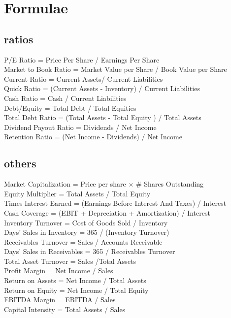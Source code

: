 \section{Formulae}
\subsection*{ratios}
\begin{scriptsize}
P/E Ratio = Price Per Share / Earnings Per Share \\
Market to Book Ratio = Market Value per Share / Book Value per Share \\
Current Ratio = Current Assets/ Current Liabilities \\
Quick Ratio = (Current Assets - Inventory) / Current Liabilities \\
Cash Ratio = Cash / Current Liabilities \\
Debt/Equity = Total Debt / Total Equities \\
Total Debt Ratio = (Total Assets - Total Equity ) / Total Assets \\
Dividend Payout Ratio = Dividends / Net Income \\
Retention Ratio = (Net Income - Dividends) / Net Income \\
\end{scriptsize}
\subsection*{others}
\begin{scriptsize}
Market Capitalization = Price per share $\times$ \# Shares Outstanding \\
Equity Multiplier = Total Assets / Total Equity \\
Times Interest Earned = (Earnings Before Interest And Taxes) / Interest \\
Cash Coverage = (EBIT + Depreciation + Amortization) / Interest \\
Inventory Turnover = Cost of Goods Sold / Inventory \\
Days' Sales in Inventory = 365 / (Inventory Turnover) \\
Receivables Turnover = Sales / Accounts Receivable \\
Days' Sales in Receivables = 365 / Receivables Turnover \\
Total Asset Turnover = Sales  /Total Assets  \\
Profit Margin = Net Income / Sales \\
Return on Assets = Net Income / Total Assets \\
Return on Equity = Net Income / Total Equity \\
EBITDA Margin = EBITDA / Sales \\
Capital Intensity = Total Assets / Sales \\
\end{scriptsize}
